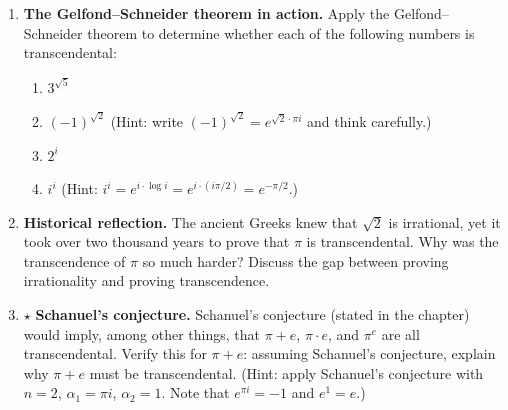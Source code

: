 \begin{enumerate}
    \item \textbf{The Gelfond--Schneider theorem in action.} Apply the Gelfond--Schneider theorem to determine whether each of the following numbers is transcendental:
    \begin{enumerate}
        \item $3^{\sqrt{5}}$
        \item $(-1)^{\sqrt{2}}$ (Hint: write $(-1)^{\sqrt{2}} = e^{\sqrt{2} \cdot \pi i}$ and think carefully.)
        \item $2^{i}$
        \item $i^i$ (Hint: $i^i = e^{i \cdot \log i} = e^{i \cdot (i\pi/2)} = e^{-\pi/2}$.)
    \end{enumerate}

    \item \textbf{Historical reflection.} The ancient Greeks knew that $\sqrt{2}$ is irrational, yet it took over two thousand years to prove that $\pi$ is transcendental. Why was the transcendence of $\pi$ so much harder? Discuss the gap between proving irrationality and proving transcendence.

    \item $\star$ \textbf{Schanuel's conjecture.} Schanuel's conjecture (stated in the chapter) would imply, among other things, that $\pi + e$, $\pi \cdot e$, and $\pi^e$ are all transcendental. Verify this for $\pi + e$: assuming Schanuel's conjecture, explain why $\pi + e$ must be transcendental. (Hint: apply Schanuel's conjecture with $n = 2$, $\alpha_1 = \pi i$, $\alpha_2 = 1$. Note that $e^{\pi i} = -1$ and $e^1 = e$.)
\end{enumerate}
